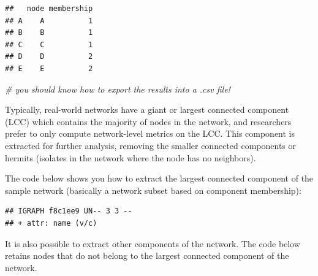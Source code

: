 \documentclass[
]{book}
\newenvironment{Shaded}{\begin{snugshade}}{\end{snugshade}}
\newcommand{\AttributeTok}[1]{\textcolor[rgb]{0.13,0.29,0.53}{#1}}
\newcommand{\CommentTok}[1]{\textcolor[rgb]{0.56,0.35,0.01}{\textit{#1}}}
\newcommand{\FunctionTok}[1]{\textcolor[rgb]{0.13,0.29,0.53}{\textbf{#1}}}
\newcommand{\NormalTok}[1]{#1}
\newcommand{\OtherTok}[1]{\textcolor[rgb]{0.56,0.35,0.01}{#1}}
\newcommand{\SpecialCharTok}[1]{\textcolor[rgb]{0.81,0.36,0.00}{\textbf{#1}}}
\begin{document}
\begin{verbatim}
##   node membership
## A    A          1
## B    B          1
## C    C          1
## D    D          2
## E    E          2
\end{verbatim}

\begin{Shaded}
\begin{Highlighting}[]
\CommentTok{\# you should know how to export the results into a .csv file! }
\end{Highlighting}
\end{Shaded}

Typically, real-world networks have a giant or largest connected component (LCC) which contains the majority of nodes in the network, and researchers prefer to only compute network-level metrics on the LCC. This component is extracted for further analysis, removing the smaller connected components or hermits (isolates in the network where the node has no neighbors).

The code below shows you how to extract the largest connected component of the sample network (basically a network subset based on component membership):

\begin{Shaded}
\end{Shaded}

\begin{verbatim}
## IGRAPH f8c1ee9 UN-- 3 3 -- 
## + attr: name (v/c)
\end{verbatim}

It is also possible to extract other components of the network. The code below retains nodes that do not belong to the largest connected component of the network.

\begin{Shaded}
\end{Shaded}
\end{document}
